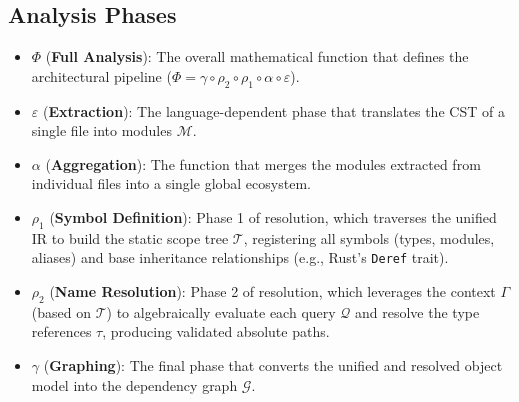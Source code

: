 \subsection{Analysis Phases}
\begin{itemize}
    \item $\Phi$ (\textbf{Full Analysis}): The overall mathematical function that defines the architectural pipeline ($\Phi = \gamma \circ \rho_2 \circ \rho_1 \circ \alpha \circ \varepsilon$).
    \item $\varepsilon$ (\textbf{Extraction}): The language-dependent phase that translates the CST of a single file into modules $\mathcal{M}$.
    \item $\alpha$ (\textbf{Aggregation}): The function that merges the modules extracted from individual files into a single global ecosystem.
    \item $\rho_1$ (\textbf{Symbol Definition}): Phase 1 of resolution, which traverses the unified IR to build the static scope tree $\mathcal{T}$, registering all symbols (types, modules, aliases) and base inheritance relationships (e.g., Rust's \texttt{Deref} trait).
    \item $\rho_2$ (\textbf{Name Resolution}): Phase 2 of resolution, which leverages the context $\Gamma$ (based on $\mathcal{T}$) to algebraically evaluate each query $\mathcal{Q}$ and resolve the type references $\tau$, producing validated absolute paths.
    \item $\gamma$ (\textbf{Graphing}): The final phase that converts the unified and resolved object model into the dependency graph $\mathcal{G}$.
\end{itemize}
